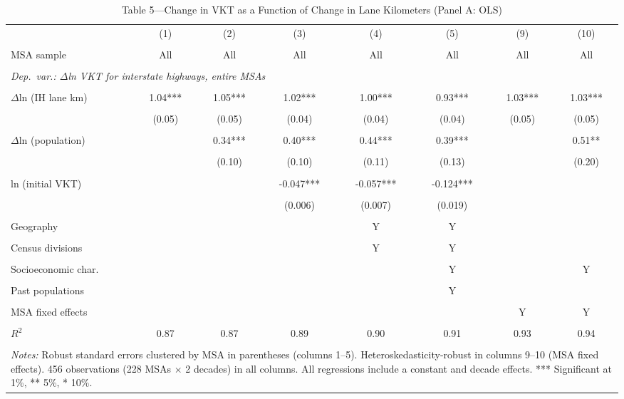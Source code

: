\begin{table}[htbp]
\centering
\small
\caption{Table 5---Change in VKT as a Function of Change in Lane Kilometers (Panel A: OLS)}
\label{tab:table5a}
\begin{tabular}{lccccccc}
\toprule
 & (1) & (2) & (3) & (4) & (5) & (9) & (10) \\\\
MSA sample & All & All & All & All & All & All & All \\\\
\midrule
\multicolumn{8}{l}{\textit{Dep.\ var.: $\Delta$ln VKT for interstate highways, entire MSAs}} \\\\
\addlinespace
$\Delta$ln (IH lane km) & 1.04*** & 1.05*** & 1.02*** & 1.00*** & 0.93*** & 1.03*** & 1.03*** \\\\
 & (0.05) & (0.05) & (0.04) & (0.04) & (0.04) & (0.05) & (0.05) \\\\
$\Delta$ln (population) & & 0.34*** & 0.40*** & 0.44*** & 0.39*** & & 0.51** \\\\
 & & (0.10) & (0.10) & (0.11) & (0.13) & & (0.20) \\\\
ln (initial VKT) & & & -0.047*** & -0.057*** & -0.124*** & & \\\\
 & & & (0.006) & (0.007) & (0.019) & & \\\\
\addlinespace
Geography             & & & & Y & Y & & \\\\
Census divisions      & & & & Y & Y & & \\\\
Socioeconomic char.   & & & & & Y & & Y \\\\
Past populations      & & & & & Y & & \\\\
MSA fixed effects     & & & & & & Y & Y \\\\
\addlinespace
$R^2$ & 0.87 & 0.87 & 0.89 & 0.90 & 0.91 & 0.93 & 0.94 \\\\
\bottomrule
\multicolumn{8}{p{0.95\linewidth}}{\footnotesize
 \textit{Notes:} Robust standard errors clustered by MSA in parentheses
 (columns 1--5). Heteroskedasticity-robust in columns 9--10 (MSA fixed effects).
 456 observations (228 MSAs $\times$ 2 decades) in all columns.
 All regressions include a constant and decade effects.
 *** Significant at 1\%, ** 5\%, * 10\%.}
\end{tabular}
\end{table}
